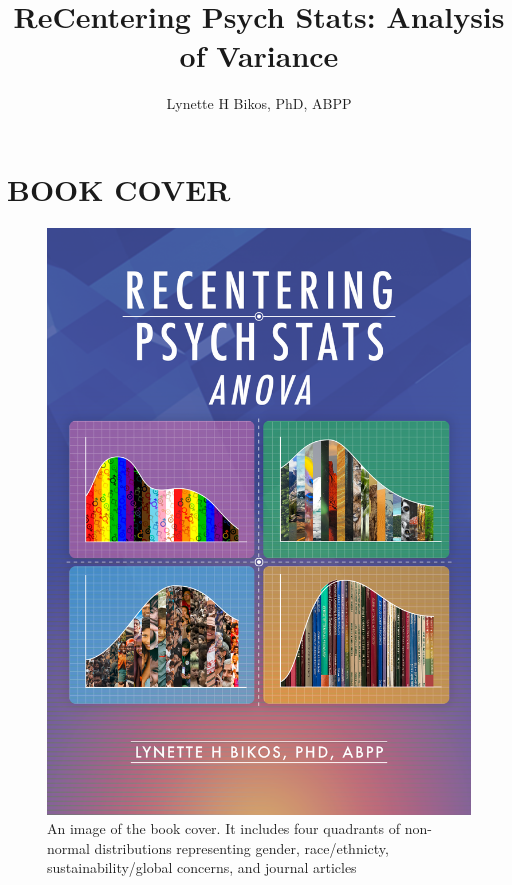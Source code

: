 \documentclass[
  english,
]{book}
\title{ReCentering Psych Stats: Analysis of Variance}
\author{Lynette H Bikos, PhD, ABPP}
\date{}
\begin{document}
\maketitle

{
\setcounter{tocdepth}{1}
\tableofcontents
}
\hypertarget{book-cover}{%
\chapter*{BOOK COVER}\label{book-cover}}

\begin{figure}
\centering
\includegraphics{images/ReC_ANOVA_bookcover.png}
\caption{An image of the book cover. It includes four quadrants of non-normal distributions representing gender, race/ethnicty, sustainability/global concerns, and journal articles}
\end{figure}
\end{document}
